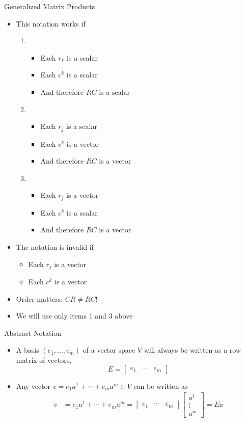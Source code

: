 \documentclass[usenames,dvipsnames,10pt]{beamer}
\newcommand\bbm{\begin{bmatrix}}\newcommand\ebm{\end{bmatrix}}
\begin{document}
\begin{frame}
  {Generalized Matrix Products}

  \begin{itemize}
  \item This notation works if
    \begin{enumerate}\setlength{\itemsep}{5pt}
    \item
      \begin{itemize}
      \item Each $r_k$ is a scalar
      \item Each $c^k$ is a scalar
      \item And therefore $RC$ is a scalar
      \end{itemize}
    \item
      \begin{itemize}
      \item Each $r_j$ is a scalar
      \item Each $c^k$ is a vector
      \item And therefore $RC$ is a vector
      \end{itemize}
    \item
      \begin{itemize}
      \item Each $r_j$ is a vector
      \item Each $c^k$ is a scalar
      \item And therefore $RC$ is a vector
      \end{itemize}
    \end{enumerate}
  \item The notation is invalid if
    \begin{itemize}
    \item Each $r_j$ is a vector
    \item Each $c^k$ is a vector
    \end{itemize}
  \item Order matters: $CR \ne RC$!
  \item We will use only items 1 and 3 above
  \end{itemize}
\end{frame}

\begin{frame}
  {Abstract Notation}

  \begin{itemize}
  \item A basis $(e_1, \dots, e_m)$ of a vector space $V$ will always be written as a row matrix of vectors,
    \[ E = \bbm e_1 & \cdots & e_m \ebm \]
  \item Any vector $v = e_1a^1 + \cdots + e_ma^m\in V$ can be written as
    \begin{align*}
      v &= e_1a^1 + \cdots + e_ma^m
          = \bbm e_1 & \cdots & e_m \ebm\bbm a^1 \\ \vdots \\ a^m \ebm
      = Ea
    \end{align*}
  \end{itemize}
\end{frame}
\end{document}
